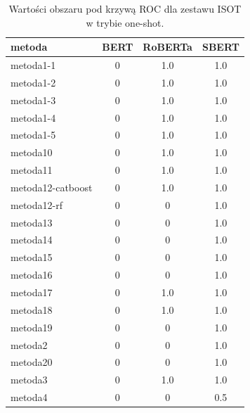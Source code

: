 \begin{table}[H]
	\centering
	\caption{Wartości obszaru pod krzywą ROC dla zestawu ISOT w trybie one-shot.}
	\label{tab:roc_auc_one_shot_isot}
	\small
	\begin{tabular}{lccc}
		\toprule
		\textbf{metoda}   & \textbf{BERT} & \textbf{RoBERTa} & \textbf{SBERT} \\
		\midrule
		metoda1-1         &   0           & 1.0              & 1.0            \\
		metoda1-2         &   0           & 1.0              & 1.0            \\
		metoda1-3         &   0           & 1.0              & 1.0            \\
		metoda1-4         &   0           & 1.0              & 1.0            \\
		metoda1-5         &   0           & 1.0              & 1.0            \\
		metoda10          &   0           & 1.0              & 1.0            \\
		metoda11          &   0           & 1.0              & 1.0            \\
		metoda12-catboost &   0           & 1.0              & 1.0            \\
		metoda12-rf       &   0           &   0              & 1.0            \\
		metoda13          &   0           &   0              & 1.0            \\
		metoda14          &   0           &   0              & 1.0            \\
		metoda15          &   0           &   0              & 1.0            \\
		metoda16          &   0           &   0              & 1.0            \\
		metoda17          &   0           & 1.0              & 1.0            \\
		metoda18          &   0           & 1.0              & 1.0            \\
		metoda19          &   0           &   0              & 1.0            \\
		metoda2           &   0           &   0              & 1.0            \\
		metoda20          &   0           &   0              & 1.0            \\
		metoda3           &   0           & 1.0              & 1.0            \\
		metoda4           &   0           &   0              & 0.5            \\

\end{tabular}
\end{table}
